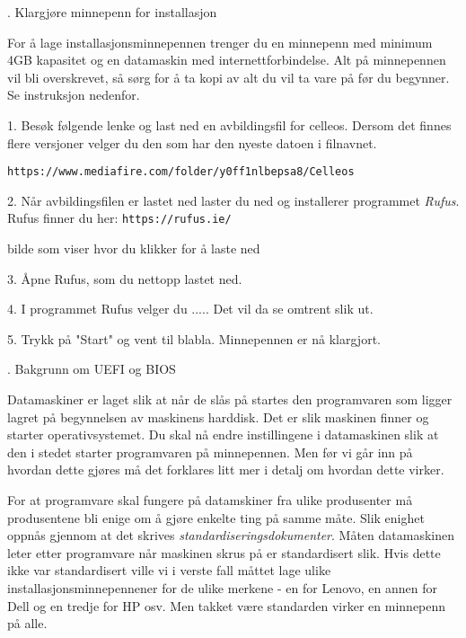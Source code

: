. Klargj\o re minnepenn for installasjon

For \aa{} lage installasjonsminnepennen trenger du en minnepenn med minimum 4GB kapasitet og en datamaskin med internettforbindelse. Alt p\aa{} minnepennen vil bli overskrevet, s\aa{} s\o rg for \aa{} ta kopi av alt du vil ta vare p\aa{} f\o r du begynner. Se instruksjon nedenfor.
\item{1.} Bes\o k f\o lgende lenke og last ned en avbildingsfil for celleos. Dersom det finnes flere versjoner velger du den som har den nyeste datoen i filnavnet.

\vskip 4pt

{\tt https://www.mediafire.com/folder/y0ff1nlbepsa8/Celleos}

\vskip 4pt

\item{2.} N\aa r avbildingsfilen er lastet ned laster du ned og installerer programmet {\it Rufus}. Rufus finner du her:
\vskip 4pt
{\tt https://rufus.ie/}

\centerline{
\epsfxsize 6cm
}

bilde som viser hvor du klikker for \aa{} laste ned
\item{3.} \AA pne Rufus, som du nettopp lastet ned.
\item{4.} I programmet Rufus velger du .....
Det vil da se omtrent slik ut.
\item{5.} Trykk p\aa{} "Start" og vent til blabla. Minnepennen er n\aa{} klargjort.

. Bakgrunn om UEFI og BIOS

Datamaskiner er laget slik at n\aa r de sl\aa s p\aa{} startes den programvaren som ligger lagret p\aa{} begynnelsen av maskinens harddisk. Det er slik maskinen finner og starter operativsystemet. Du skal n\aa{} endre instillingene i datamaskinen slik at den i stedet starter programvaren p\aa{} minnepennen. Men f\o r vi g\aa r inn p\aa{} hvordan dette gj\o res m\aa{} det forklares litt mer i detalj om hvordan dette virker.

For at programvare skal fungere p\aa{} datamskiner fra ulike produsenter m\aa{} produsentene bli enige om  \aa{} gj\o re enkelte ting p\aa{} samme m\aa te. Slik enighet oppn\aa s gjennom at det skrives {\it standardiseringsdokumenter}. M\aa ten datamaskinen leter etter programvare n\aa r maskinen skrus p\aa{} er standardisert slik. Hvis dette ikke var standardisert ville vi i verste fall m\aa ttet lage ulike installasjonsminnepennener for de ulike merkene - en for Lenovo, en annen for Dell og  en tredje for HP osv. Men takket v\ae re standarden virker en minnepenn p\aa{} alle.

